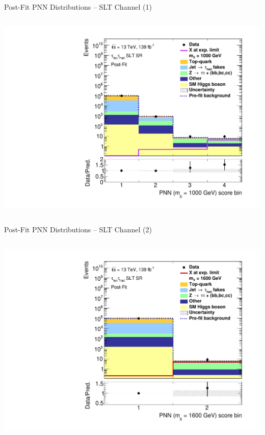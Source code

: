 \documentclass[11pt, xcolor={dvipsnames}, aspectratio=169]{beamer}
\begin{document}
\begin{frame}{Post-Fit PNN Distributions -- \allbold{\lephad} SLT Channel (1)}
\begin{columns}
    \centering


    \includegraphics[width=\textwidth]{results_res/postfit/Region_BMin0_incJet1_dist1000_J2_D2HDMPNN_T2_SpcTauLH_Y2015_LTT0_L1_GlobalFit_conditionnal_mu0log}

  \end{columns}
\end{frame}


\begin{frame}{Post-Fit PNN Distributions -- \allbold{\lephad} SLT Channel (2)}
  \begin{columns}
    \centering


    \includegraphics[width=\textwidth]{results_res/postfit/Region_BMin0_incJet1_dist1600_J2_D2HDMPNN_T2_SpcTauLH_Y2015_LTT0_L1_GlobalFit_conditionnal_mu0log}

  \end{columns}
\end{frame}
\end{document}
